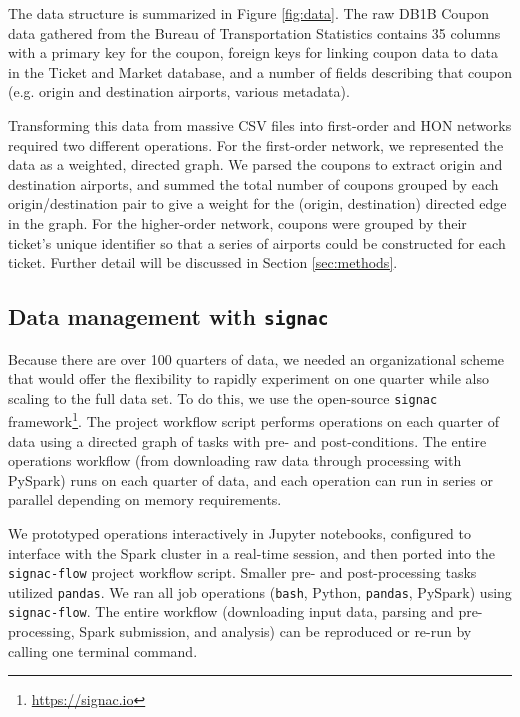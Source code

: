 \documentclass[sigconf]{acmart}
\begin{document}
The data structure is summarized in Figure \ref{fig:data}. The raw DB1B Coupon data gathered from the Bureau of Transportation Statistics contains 35 columns with a primary key for the coupon, foreign keys for linking coupon data to data in the Ticket and Market database, and a number of fields describing that coupon (e.g. origin and destination airports, various metadata).

Transforming this data from massive CSV files into first-order and HON networks required two different operations. For the first-order network, we represented the data as a weighted, directed graph. We parsed the coupons to extract origin and destination airports, and summed the total number of coupons grouped by each origin/destination pair to give a weight for the (origin, destination) directed edge in the graph. For the higher-order network, coupons were grouped by their ticket's unique identifier so that a series of airports could be constructed for each ticket. Further detail will be discussed in Section \ref{sec:methods}.

\subsection{Data management with \texttt{signac}}
%     

Because there are over 100 quarters of data, we needed an organizational scheme that would offer the flexibility to rapidly experiment on one quarter while also scaling to the full data set. To do this, we use the open-source \texttt{signac} framework\footnote{\url{https://signac.io}}. The project workflow script performs operations on each quarter of data using a directed graph of tasks with pre- and post-conditions. The entire operations workflow (from downloading raw data through processing with PySpark) runs on each quarter of data, and each operation can run in series or parallel depending on memory requirements.

We prototyped operations interactively in Jupyter notebooks, configured to interface with the Spark cluster in a real-time session, and then ported into the \texttt{signac-flow} project workflow script. Smaller pre- and post-processing tasks utilized \texttt{pandas}. We ran all job operations (\texttt{bash}, Python, \texttt{pandas}, PySpark) using \texttt{signac-flow}. The entire workflow (downloading input data, parsing and pre-processing, Spark submission, and analysis) can be reproduced or re-run by calling one terminal command.
\end{document}
